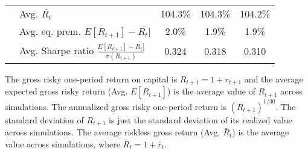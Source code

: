 \documentclass[letterpaper,12pt]{article}
\theoremstyle{definition}
\begin{document}
\begin{spacing}{1.5}
\begin{table}[htbp]
\begin{threeparttable}
\begin{tabular}{>{\small}l| >{\small}l| >{\small}c| >{\small}c| >{\small}c}
      & \quad Avg. $\bar{R_t}$ & 104.3\% & 104.3\% & 104.2\% \\
      & \quad Avg. eq. prem. $E[R_{t+1}] - \bar{R_t]}$ & 2.0\% & 1.9\% & 1.9\% \\
      & \quad Avg. Sharpe ratio $\frac{E[R_{t+1}] - \bar{R_t]}}{\sigma(R_{t+1})}$ & 0.324 & 0.318 & 0.310 \\
      \hline\hline
    \end{tabular}
    \begin{tablenotes}
      \scriptsize{\item[]The gross risky one-period return on capital is $R_{t+1} = 1 + r_{t+1}$ and the average expected gross risky return (Avg. $E[R_{t+1}]$) is the average value of $R_{t+1}$ across simulations. The annualized gross risky one-period return is $(R_{t+1})^{1/30}$. The standard deviation of $R_{t+1}$ is just the standard deviation of its realized value across simulations. The average riskless gross return (Avg. $\bar{R}_t$) is the average value across simulations, where $\bar{R}_t=1+\bar{r}_t$.}
    \end{tablenotes}
    \end{threeparttable}
  \end{table}


\end{spacing}
\end{document}
